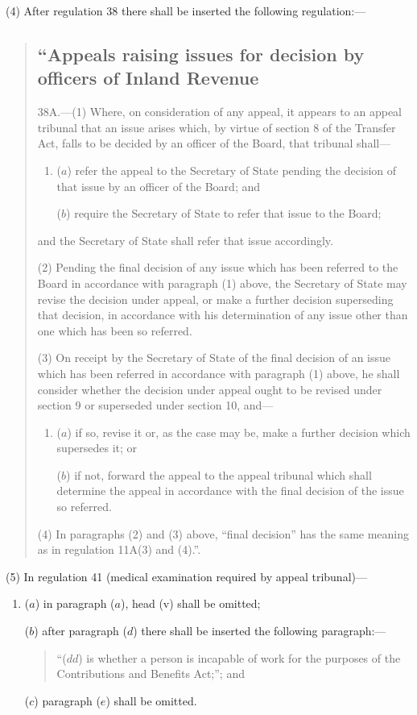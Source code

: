 \documentclass[12pt,a4paper]{article}
\begin{document}
(4) After regulation 38 there shall be inserted the following regulation:—
\begin{quotation}
\subsection*{“Appeals raising issues for decision by officers of Inland Revenue}

38A.---(1)  Where, on consideration of any appeal, it appears to an appeal tribunal that an issue arises which, by virtue of section 8 of the Transfer Act, falls to be decided by an officer of the Board, that tribunal shall—
\begin{enumerate}\item[]
($a$) refer the appeal to the Secretary of State pending the decision of that issue by an officer of the Board; and

($b$) require the Secretary of State to refer that issue to the Board;
\end{enumerate}
and the Secretary of State shall refer that issue accordingly.

(2) Pending the final decision of any issue which has been referred to the Board in accordance with paragraph (1) above, the Secretary of State may revise the decision under appeal, or make a further decision superseding that decision, in accordance with his determination of any issue other than one which has been so referred.

(3) On receipt by the Secretary of State of the final decision of an issue which has been referred in accordance with paragraph (1) above, he shall consider whether the decision under appeal ought to be revised under section 9 or superseded under section 10, and—
\begin{enumerate}\item[]
($a$) if so, revise it or, as the case may be, make a further decision which supersedes it; or

($b$) if not, forward the appeal to the appeal tribunal which shall determine the appeal in accordance with the final decision of the issue so referred.
\end{enumerate}

(4) In paragraphs (2) and (3) above, “final decision” has the same meaning as in regulation 11A(3) and (4).”.
\end{quotation}

(5) In regulation 41 (medical examination required by appeal tribunal)—
\begin{enumerate}\item[]
($a$) in paragraph ($a$), head (v) shall be omitted;

($b$) after paragraph ($d$) there shall be inserted the following paragraph:—
\begin{quotation}
“($dd$) is whether a person is incapable of work for the purposes of the Contributions and Benefits Act;”; and
\end{quotation}

($c$) paragraph ($e$) shall be omitted.
\end{enumerate}
\end{document}
